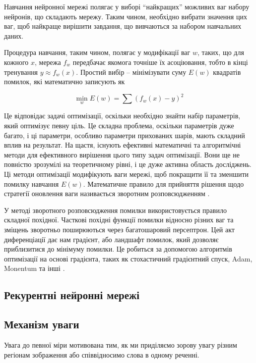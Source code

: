 \documentclass[a4paper,14pt]{extreport}
\begin{document}
Навчання нейронної мережі полягає у виборі ``найкращих'' можливих
ваг набору нейронів, що складають мережу. Таким чином,
необхідно вибрати значення цих ваг, щоб найкраще вирішити
завдання, що вивчаються за набором навчальних даних.

Процедура навчання, таким чином, полягає у модифікації ваг $w$,
таких, що для кожного $x$, мережа $f_w$ передбачає якомога
точніше їх асоціювання, тобто в кінці тренування $y \approx f_w(x)$.
Простий вибір -- мінімізувати суму $E(w)$ квадратів
помилок, які математично записують як

\begin{equation}
    \min_w E(w) = \sum (f_w(x) - y)^2
\end{equation}

Це відповідає задачі оптимізації, оскільки необхідно знайти
набір параметрів, який оптимізує певну ціль.
Це складна проблема, оскільки параметрів дуже багато, і ці
параметри, особливо параметри прихованих шарів, мають складний
вплив на результат. На щастя, існують ефективні математичні та
алгоритмічні методи для ефективного вирішення цього типу задач
оптимізації. Вони ще не повністю зрозумілі на теоретичному
рівні, і це дуже активна область досліджень. Ці методи
оптимізації модифікують ваги мережі, щоб покращити її та
зменшити помилку навчання $E(w)$. Математичне
правило для прийняття рішення щодо стратегії оновлення
ваги називається зворотним розповсюдженням \cite{nn:backpropagation}.

У методі зворотного розповсюдження помилки
використовується правило складної похідної.
Часткові похідні функції помилки відносно різних ваг та зміщень
зворотньо поширюються через багатошаровий персептрон.
Цей акт диференціації дає нам градієнт, або ландшафт помилок,
який дозволяє приблизитися до мінімуму помилки. Це робиться
за допомогою алгоритмів оптимізації на основі градієнта, таких
як стохастичний градієнтний спуск, Adam, Monentum та інші
\cite{gradient-descend}.



\subsection{Рекурентні нейронні мережі}

\subsection{Механізм уваги}
Увага до певної міри мотивована тим, як ми приділяємо зорову увагу
різним регіонам зображення або співвідносимо слова в одному реченні.
\end{document}
